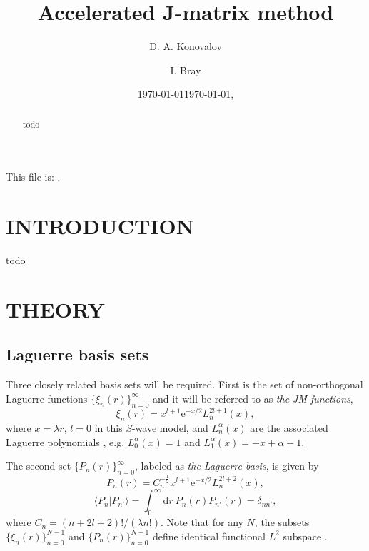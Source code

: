 \documentclass[aip,pra,showpacs,aps,twocolumn,groupedaddress,floatfix]{revtex4}
\newcommand{\beq}{\begin{equation}}
\newcommand{\eeq}{\end{equation}}
\begin{document}
\title {Accelerated J-matrix method}

\author{D. A. Konovalov}

\author{I. Bray}



\date{\today}
\date{\today, \currenttime}

\begin{abstract}
todo


\end{abstract}

\maketitle
This file is: \currfilename.


\section{INTRODUCTION}

todo

\section{THEORY}

\subsection{Laguerre basis sets}
Three closely related basis sets will be required.
First is the set of non-orthogonal Laguerre functions $\{ \xi_n(r)\}_{n=0}^\infty$ \cite{BR76p1491, YF75} and it will be referred to as {\em the JM functions},
\beq
\xi_n(r) = x^{l+1} \mbox{e}^{-x /2}
L_n^{2l+1}(x),
\label{Ln_JM}\eeq
where $x=\lambda r$, $l=0$ in this $S$-wave model, and $L_n^{\alpha}(x)$ are the associated Laguerre polynomials \cite{abramowitz}, e.g. $L_0^{\alpha}(x)=1$ and $L_1^{\alpha}(x)=-x+\alpha+1$.

The second set $\{ P_n(r)\}_{n=0}^\infty$, labeled as {\em the Laguerre basis}, is given by
\beq
P_n(r) = C_n^{-\frac{1}{2}} x^{l+1} \mbox{e}^{-x /2}
L_n^{2l+2}(x),
\label{Ln_orthog}\eeq
\beq
\langle P_n | P_{n'} \rangle = \int_0^{\infty} \mbox{d}r \ P_n(r) P_{n'}(r)=\delta_{nn'},
\label{R_n_norm}\eeq
where $C_n=(n+2l+2)!/(\lambda n!)$. Note that for any $N$, the subsets $\{ \xi_n(r)\}_{n=0}^{N-1}$ and $\{ P_n(r)\}_{n=0}^{N-1}$ define identical functional $L^2$ subspace \cite{KB10p022708}.
\end{document}
